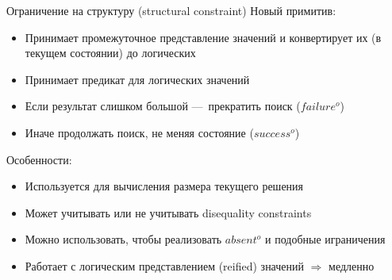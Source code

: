 \documentclass[aspectratio=169
  , xcolor={svgnames}
  , hyperref={ colorlinks,citecolor=Blue
             , linkcolor=DarkRed,urlcolor=DarkBlue}
  , russian
  ]{beamer}
\begin{document}
\begin{frame}{Ограничение на структуру (structural constraint)}
Новый примитив:
\begin{itemize}
\item Принимает промежуточное представление значений и конвертирует их (в текущем состоянии) до логических %
\item Принимает предикат для логических значений %
\item Если результат слишком большой ---~прекратить поиск%
($failure^o$)
\item Иначе продолжать поиск, не меняя состояние 
($success^o$)
\end{itemize}
\vspace{1em}
Особенности:
\begin{itemize}
\item Используется для вычисления размера текущего решения
\item Может учитывать или не учитывать disequality constraints
\item Можно использовать, чтобы реализовать $absent^o$ и подобные играничения
\item Работает с логическим представлением (reified) значений $\Rightarrow$ медленно
\end{itemize}
\end{frame}
\end{document}
